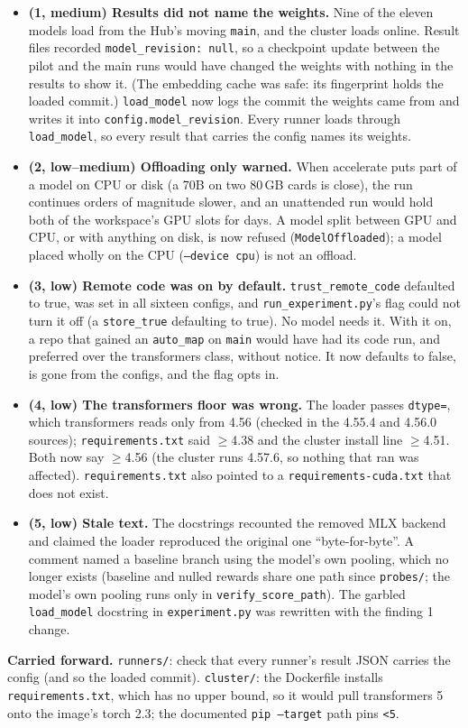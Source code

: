 \documentclass{article}
\begin{document}
\begin{itemize}
  \item \textbf{(1, medium) Results did not name the weights.} Nine of the eleven models load from the Hub's
        moving \texttt{main}, and the cluster loads online. Result files recorded \texttt{model\_revision: null}, so
        a checkpoint update between the pilot and the main runs would have changed the weights with nothing in
        the results to show it. (The embedding cache was safe: its fingerprint holds the loaded commit.)
        \texttt{load\_model} now logs the commit the weights came from and writes it into
        \texttt{config.model\_revision}. Every runner loads through \texttt{load\_model}, so every result that
        carries the config names its weights.
  \item \textbf{(2, low--medium) Offloading only warned.} When accelerate puts part of a model on CPU or disk
        (a 70B on two 80\,GB cards is close), the run continues orders of magnitude slower, and an unattended run
        would hold both of the workspace's GPU slots for days. A model split between GPU and CPU, or with
        anything on disk, is now refused (\texttt{ModelOffloaded}); a model placed wholly on the CPU
        (\texttt{--device cpu}) is not an offload.
  \item \textbf{(3, low) Remote code was on by default.} \texttt{trust\_remote\_code} defaulted to true, was set
        in all sixteen configs, and \texttt{run\_experiment.py}'s flag could not turn it off (a
        \texttt{store\_true} defaulting to true). No model needs it. With it on, a repo that gained an
        \texttt{auto\_map} on \texttt{main} would have had its code run, and preferred over the transformers
        class, without notice. It now defaults to false, is gone from the configs, and the flag opts in.
  \item \textbf{(4, low) The transformers floor was wrong.} The loader passes \texttt{dtype=}, which
        transformers reads only from 4.56 (checked in the 4.55.4 and 4.56.0 sources); \texttt{requirements.txt}
        said $\geq$4.38 and the cluster install line $\geq$4.51. Both now say $\geq$4.56 (the cluster runs 4.57.6,
        so nothing that ran was affected). \texttt{requirements.txt} also pointed to a
        \texttt{requirements-cuda.txt} that does not exist.
  \item \textbf{(5, low) Stale text.} The docstrings recounted the removed MLX backend and claimed the loader
        reproduced the original one ``byte-for-byte''. A comment named a baseline branch using the model's own
        pooling, which no longer exists (baseline and nulled rewards share one path since \texttt{probes/}; the
        model's own pooling runs only in \texttt{verify\_score\_path}). The garbled \texttt{load\_model} docstring
        in \texttt{experiment.py} was rewritten with the finding 1 change.
\end{itemize}
\textbf{Carried forward.} \texttt{runners/}: check that every runner's result JSON carries the config (and so the
loaded commit). \texttt{cluster/}: the Dockerfile installs \texttt{requirements.txt}, which has no upper bound, so
it would pull transformers 5 onto the image's torch 2.3; the documented \texttt{pip --target} path pins
\texttt{<5}.
\end{document}

